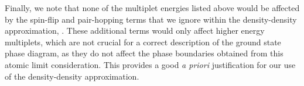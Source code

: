 \documentclass[aps,prb,twocolumn,superscriptaddress,10pt]{revtex4-1}
\newcommand{\pref}[1]{\prettyref{#1}}%
\begin{document}
Finally, we note that none of the multiplet energies listed above would be affected by the spin-flip and pair-hopping terms that we ignore within the density-density approximation, \pref{eq:hint}. These additional terms would only affect higher energy multiplets, which are not crucial for a correct description of the ground state phase diagram, as they do not affect the phase boundaries obtained from this atomic limit consideration. This provides a good {\it a priori} justification for our use of the density-density approximation. 



\end{document}
